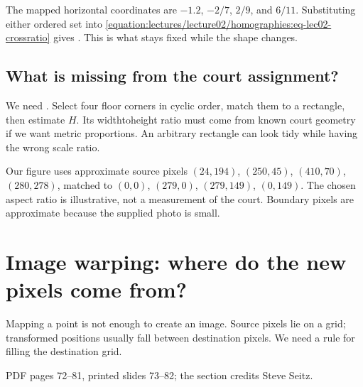 \documentclass[letterpaper,11pt,english,openany,oneside]{jupyterBook}
\begin{document}
\sphinxAtStartPar
The mapped horizontal coordinates are \(-1.2\), \(-2/7\), \(2/9\), and \(6/11\). Substituting either ordered set into \eqref{equation:lectures/lecture02/homographies:eq-lec02-crossratio} gives . This is what stays fixed while the shape changes.

\par\medskip


\subsection{What is missing from the court assignment?}
\label{\detokenize{lectures/lecture02/homographies:what-is-missing-from-the-court-assignment}}
\sphinxAtStartPar
We need . Select four floor corners in cyclic order, match them to a rectangle, then estimate \(H\). Its width\sphinxhyphen{}to\sphinxhyphen{}height ratio must come from known court geometry if we want metric proportions. An arbitrary rectangle can look tidy while having the wrong scale ratio.

\sphinxAtStartPar
Our figure uses approximate source pixels \((24,194)\), \((250,45)\), \((410,70)\), \((280,278)\), matched to \((0,0)\), \((279,0)\), \((279,149)\), \((0,149)\). The chosen aspect ratio is illustrative, not a measurement of the court. Boundary pixels are approximate because the supplied photo is small. 

\ignorespaces
{}\ignorespaces
{}\ignorespaces
\sphinxstepscope


\section{Image warping: where do the new pixels come from?}
\label{\detokenize{lectures/lecture02/warping:image-warping-where-do-the-new-pixels-come-from}}\label{\detokenize{lectures/lecture02/warping:lec02-warping}}\label{\detokenize{lectures/lecture02/warping::doc}}
\sphinxAtStartPar
Mapping a point is not enough to create an image. Source pixels lie on a grid; transformed positions usually fall between destination pixels. We need a rule for filling the destination grid.

\sphinxAtStartPar
{} PDF pages 72–81, printed slides 73–82; the section credits Steve Seitz.
\end{document}
